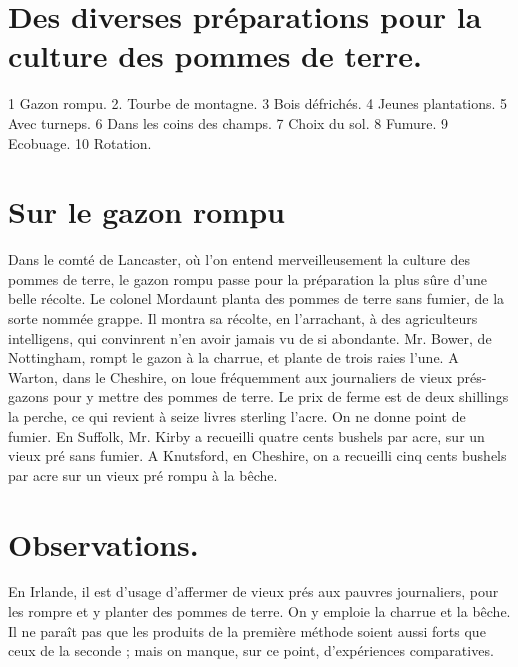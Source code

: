 \section{Des diverses préparations pour la culture des pommes de terre.}
1 Gazon rompu.
2. Tourbe de montagne.\setcounter{page}{267} 3 Bois défrichés.
4 Jeunes plantations.
5 Avec turneps.
6 Dans les coins des champs.
7 Choix du sol.
8 Fumure.
9 Ecobuage.
10 Rotation.
\section{Sur le gazon rompu}
Dans le comté de Lancaster, où l'on entend merveilleusement la culture des pommes de terre, le gazon rompu passe pour la préparation la plus sûre d'une belle récolte.
Le colonel Mordaunt planta des pommes de terre sans fumier, de la sorte nommée grappe. Il montra sa récolte, en l'arrachant, à des agriculteurs intelligens, qui convinrent n'en avoir jamais vu de si abondante.
Mr. Bower, de Nottingham, rompt le gazon à la charrue, et plante de trois raies l'une.
A Warton, dans le Cheshire, on loue fréquemment aux journaliers de vieux prés-gazons pour y mettre des pommes de terre. Le prix de ferme est de deux shillings la perche, ce qui revient à seize livres sterling l'acre. On ne donne point de fumier.\setcounter{page}{268} En Suffolk, Mr. Kirby a recueilli quatre cents bushels par acre, sur un vieux pré sans fumier.
A Knutsford, en Cheshire, on a recueilli cinq cents bushels par acre sur un vieux pré rompu à la bêche.
\section{Observations.}
En Irlande, il est d'usage d'affermer de vieux prés aux pauvres journaliers, pour les rompre et y planter des pommes de terre. On y emploie la charrue et la bêche. Il ne paraît pas que les produits de la première méthode soient aussi forts que ceux de la seconde ; mais on manque, sur ce point, d'expériences comparatives.
